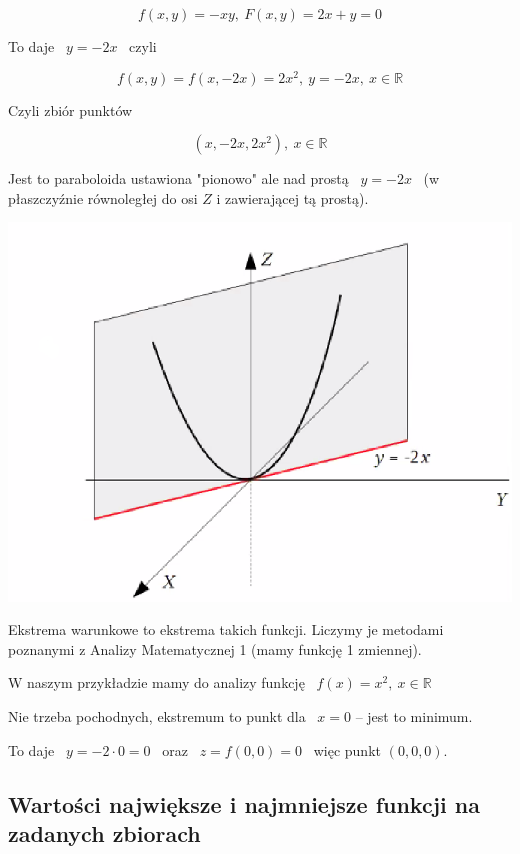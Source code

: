 \begin{przyklad}

\[ f(x,y) = -xy, \ F(x,y) = 2x + y = 0 \]

\begin{center}To daje \ $ y = -2x $ \ czyli\end{center} 
\[ f(x,y) = f(x, -2x) = 2x^2, \ y=-2x, \ x\in \mathbb{R} \]

\begin{center}Czyli zbiór punktów\end{center}
\[ (x, -2x, 2x^2), \ x \in \mathbb{R} \]

Jest to paraboloida ustawiona "pionowo" ale nad prostą \ $ y= -2x $ \ (w płaszczyźnie równoległej do osi $Z$ i zawierającej tą prostą).

\begin{center}
\includegraphics[scale=0.5]{img/paraboloida_przyklad.png}
\end{center}


Ekstrema warunkowe to ekstrema takich funkcji. Liczymy je metodami poznanymi z Analizy Matematycznej 1 (mamy funkcję 1 zmiennej).

W naszym przykładzie mamy do analizy funkcję \ $ f(x) = x^2, \ x \in \mathbb{R} $

Nie trzeba pochodnych, ekstremum to punkt dla \ $x = 0$ -- jest to minimum.

To daje \ $ y = -2 \cdot 0 = 0 $ \ oraz \ $ z = f(0,0) = 0 $ \ więc punkt $ (0,0,0) $.
\end{przyklad}

\subsection*{Wartości największe i najmniejsze funkcji na zadanych zbiorach}

